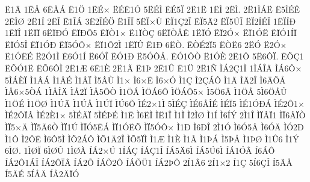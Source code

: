 {^^cb1^^c4
1^^cb^^c5
6^^cb^^c5^^c1
^^cb1^^d6
1^^cb^^c9^^d7
^^cb^^c9^^cb1^^d3
5^^cb^^c9^^cc
^^cb^^c95^^cf
2^^cb1^^cb
1^^cb^^cc
2^^cb^^cc.
2^^cb1^^cc^^c1^^cb
^^cb5^^cc^^c9^^ca
2^^cb^^cc^^d8
2^^cb1^^cd
2^^cb^^ce
^^cb1^^ce^^c1
3^^cb2^^ce^^c9^^d6
^^cb1^^ce^^cf
5^^cb^^cf^^d7^^d9
^^cb^^cf1^^c72^^ce
^^cb^^cf5^^c42
^^cb^^cf5^^da^^ce
^^cb^^cf2^^cd^^c9^^ce
1^^cb^^cf^^cd^^d0
1^^cb^^cf^^ce
1^^cb^^cf^^cf
6^^cb^^cf^^d0^^d3
^^cb^^cf^^d0^^d55
^^cb^^cf^^d21^^d7
^^cb1^^cf^^d2^^c7
6^^cb^^cf^^d2^^c5^^ca
1^^cb^^cf^^d3
^^cb^^cf2^^d3^^d7
^^cb^^cf1^^d3^^cb
^^cb^^cf^^d31^^cd^^cf
^^cb^^cf^^d35^^ce
^^cb^^cf1^^d3^^d0
^^cb^^cf5^^d3^^d4^^d7
^^cb^^cf1^^d42^^cc
1^^cb^^cf^^db
^^cb1^^d0
6^^cb^^d2.
^^cb^^d2^^c92^^cf5
^^cb^^d2^^cb6
2^^cb^^d3
^^cb2^^d3^^d7
^^cb1^^d3^^cb^^c9
^^cb2^^d31^^cc
^^cb6^^d31^^cd
^^cb6^^d3^^ce
^^cb^^d31^^d0
^^cb5^^d3^^d4^^c5.
^^cb^^d31^^d4^^d2
^^cb1^^d3^^c8
2^^cb1^^d4
5^^cb6^^d4^^cf.
^^cb^^d5^^c71
^^cb^^d5^^d31^^cb
^^cb^^d56^^d4^^cc
2^^cb1^^c6
6^^cb1^^c8
2^^cb1^^c3
^^cb1^^de
2^^cb1^^db
^^cb1^^dc
2^^cb1^^d1
^^cc^^c12^^c71^^cc
1^^cc^^c1^^ce^^c4
^^cc^^c16^^d4^^d7
5^^cc^^c1^^c8^^cf
^^cc1^^c2^^c1
^^cc1^^c2^^c9
^^cc1^^c2^^cf
^^cc5^^c2^^d9
^^cc1^^d7
^^cc6^^d7^^cb
^^cc6^^d7^^d3
^^cc1^^c7
^^cc2^^c7^^c1^^d4
^^cc1^^c4
^^cc^^c42^^ce
^^cc6^^c4^^d5^^c5
^^cc^^c56^^d75^^d2^^c1
1^^cc^^c5^^ce^^c4
^^cc^^c52^^cf
^^cc^^c55^^d4^^d2
^^cc1^^d6^^c1
^^cc^^d6^^c16^^d4
^^cc^^d6^^c1^^d45^^d7
^^cc5^^d66^^c2
^^cc1^^d6^^c5
5^^cc6^^d6^^c5^^db
^^cc1^^d6^^c9
^^cc1^^d6^^d8
^^cc1^^da^^c4
^^cc1^^da^^c5
^^cc1^^da^^cf
^^cc^^da6^^d5
^^cc^^c92^^d71^^cc
5^^cc^^c9^^c7
^^cc^^c96^^c5^^ce^^c9
^^cc^^c9^^cf5
^^cc^^c91^^d3^^d0^^c1
^^cc^^c92^^d41^^d7
^^cc^^c92^^d4^^cf^^c2
^^cc^^c92^^c81^^d7
5^^cc^^c9^^c3^^cf
5^^cc^^c9^^de^^c9
^^cc1^^cb
^^cc6^^cb^^cc
^^cc^^cb1^^ce
^^cc1^^cc
^^cc2^^cc^^d8
^^cc1^^cd
^^cc6^^cd^^dd
2^^cc1^^ce
^^cc^^cf^^c2^^cf1
^^cc^^cf6^^c2^^cf^^d2
^^cc^^cf5^^d7^^c4
^^cc^^cf5^^c46^^d2
^^cc^^cf1^^da
^^cc^^cf^^d35^^cb^^c1
^^cc^^cf1^^d3^^cb^^d5
^^cc^^cf5^^d3^^d4^^d7
^^cc1^^d0
^^cc6^^d0^^ce
2^^cc1^^d3
^^cc6^^d35^^c2
^^cc6^^d3^^c4
^^cc^^d32^^d0
^^cc1^^d4
^^cc2^^d4^^cb
^^cc6^^d45^^cc
^^cc^^d52^^c1^^d4
^^cc^^d51^^c42^^ce
^^cc^^d55^^cf^^cc
^^cc1^^c6
^^cc1^^c8
^^cc1^^c3
^^cc1^^de^^c1
^^cc5^^de^^c5
^^cc1^^de^^d8
^^cc1^^db6
^^cc1^^dd
6^^cc^^d8.
1^^cc^^d8^^cf
6^^cc^^d8^^db
1^^cc^^d8^^c0
^^cd^^c12^^d7^^da
1^^cd^^c1^^c7
^^cd^^c1^^c71^^ce
^^cd^^c15^^c46^^cc
^^cd^^c15^^da6^^cc
^^cd^^c11^^d3^^c2
^^cd6^^c1^^d4
^^cd^^c12^^d41^^c1^^ce
^^cd^^c12^^d4^^cf^^c2
^^cd^^c12^^d5
^^cd^^c1^^d52^^d4
^^cd^^c1^^d5^^dc1
^^cd^^c12^^de^^d4
2^^cd1^^c26
2^^cd1^^d72
^^cd1^^c7
5^^cd6^^c7^^ce
^^cd5^^c4^^c5
^^cd5^^c4^^c9
5^^cd^^c5^^c4
^^cd^^c52^^c4^^cf^^d3
}
